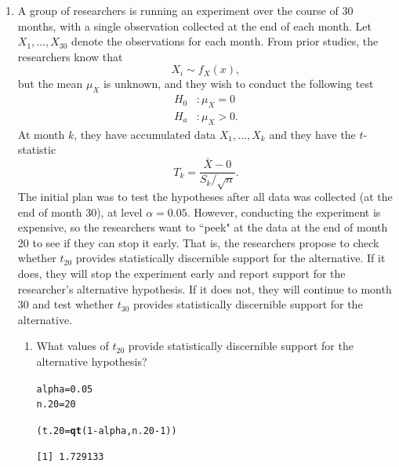 \documentclass{article}\usepackage[]{graphicx}\usepackage[]{xcolor}
\makeatletter
\newcommand{\hlnum}[1]{\textcolor[rgb]{0.686,0.059,0.569}{#1}}%
\newcommand{\hlopt}[1]{\textcolor[rgb]{0,0,0}{#1}}%
\newcommand{\hldef}[1]{\textcolor[rgb]{0.345,0.345,0.345}{#1}}%
\newcommand{\hlkwb}[1]{\textcolor[rgb]{0.69,0.353,0.396}{#1}}%
\newcommand{\hlkwd}[1]{\textcolor[rgb]{0.737,0.353,0.396}{\textbf{#1}}}%
\newenvironment{kframe}{%
 \def\at@end@of@kframe{}%
 \ifinner\ifhmode%
  \def\at@end@of@kframe{\end{minipage}}%
  \begin{minipage}{\columnwidth}%
 \fi\fi%
 \def\FrameCommand##1{\hskip\@totalleftmargin \hskip-\fboxsep
 \colorbox{shadecolor}{##1}\hskip-\fboxsep
     \hskip-\linewidth \hskip-\@totalleftmargin \hskip\columnwidth}%
 \MakeFramed {\advance\hsize-\width
   \@totalleftmargin\z@ \linewidth\hsize
   \@setminipage}}%
 {\par\unskip\endMakeFramed%
 \at@end@of@kframe}
\newenvironment{knitrout}{}{} %
\makeatother
\begin{document}
\begin{enumerate}
\item A group of researchers is running an experiment over the course of 30 months, 
with a single observation collected at the end of each month. Let $X_1, ..., X_{30}$
denote the observations for each month. From prior studies, the researchers know that
\[X_i \sim f_X(x),\]
but the mean $\mu_X$ is unknown, and they wish to conduct the following test
\begin{align*}
H_0&: \mu_X = 0\\
H_a&: \mu_X > 0.
\end{align*}
At month $k$, they have accumulated data $X_1, ..., X_k$ and they have the 
$t$-statistic
\[T_k = \frac{\bar{X} - 0}{S_k/\sqrt{n}}.\]
The initial plan was to test the hypotheses after all data was collected (at the 
end of month 30), at level $\alpha=0.05$. However, conducting the experiment is 
expensive, so the researchers want to ``peek" at the data at the end of month 20 
to see if they can stop it early. That is, the researchers propose to check 
whether $t_{20}$ provides statistically discernible support for the alternative. 
If it does, they will stop the experiment early and report support for the 
researcher's alternative hypothesis. If it does not, they will continue to month 
30 and test whether $t_{30}$ provides statistically discernible support for the
alternative.

\begin{enumerate}
  \item What values of $t_{20}$ provide statistically discernible support for the
  alternative hypothesis?
  
\begin{knitrout}
\color{fgcolor}\begin{kframe}
\begin{alltt}
\hldef{alpha} \hlkwb{=} \hlnum{0.05}
\hldef{n.20} \hlkwb{=} \hlnum{20}

\hldef{(t.20} \hlkwb{=} \hlkwd{qt}\hldef{(}\hlnum{1} \hlopt{-} \hldef{alpha, n.20}\hlopt{-}\hlnum{1}\hldef{))}
\end{alltt}
\begin{verbatim}
[1] 1.729133
\end{verbatim}
\end{kframe}
\end{knitrout}


\end{enumerate}
\end{enumerate}
\end{document}
